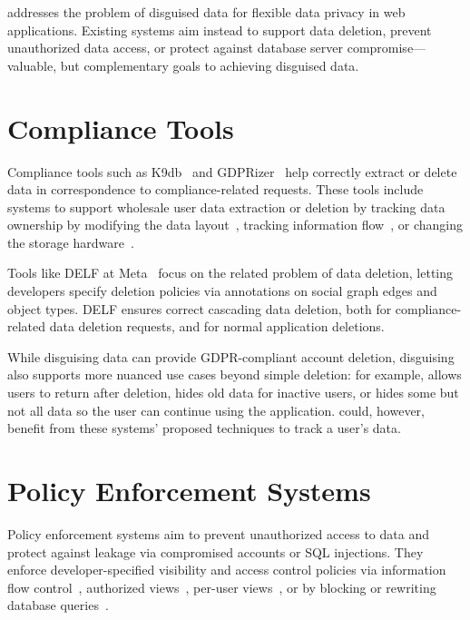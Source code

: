 
\sys addresses the problem of disguised data for flexible data privacy in web
applications.
%
Existing systems aim instead to support data deletion, prevent unauthorized data
access, or protect against database server compromise---valuable, but
complementary goals to achieving disguised data.%

\section{Compliance Tools}
Compliance tools such as K9db~\cite{k9db} and GDPRizer~\cite{gdprizer} help
correctly extract or delete data in correspondence to compliance-related
requests.
%
These tools include systems to support wholesale user data extraction or deletion by tracking data
ownership by modifying the data layout~\cite{usershards, k9db}, tracking
information flow~\cite{schengendb}, or changing the
storage hardware~\cite{sdp}.
%

%
Tools like DELF at Meta~\cite{delf} focus on the related problem of data
deletion, letting developers specify deletion policies via
annotations on social graph edges and object types. DELF ensures correct
cascading data deletion, both for compliance-related data deletion requests, and
for normal application deletions.
%

%
While disguising data can provide GDPR-compliant account deletion, disguising
also supports more nuanced use cases beyond simple deletion: for example, \sys
allows users to return after deletion, hides old data for inactive users, or
hides some but not all data so the user can continue using the application.
%
\sys could, however, benefit from these systems' proposed techniques to track a
user's data.
%

\section{Policy Enforcement Systems}
Policy enforcement systems 
aim to prevent unauthorized access to data and protect against leakage via
compromised accounts or SQL injections.  They enforce developer-specified
visibility and access control policies via information flow
control~\cite{static, jeeves, jif, hails, ifdb}, authorized views~\cite{oracle},
per-user views~\cite{multiverse}, or by blocking or rewriting database
queries~\cite{blockaid, qapla, sieve}.

